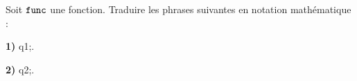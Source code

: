 \documentclass[exercice]{thedocument}%
\begin{document}
%
Soit $\<func;$ une fonction. Traduire les phrases suivantes en notation
mathématique :\par\medskip
{\bfseries 1) }\<q1;.\dotedline\par\smallskip
{\bfseries 2) }\<q2;.\dotedline
\end{document}
